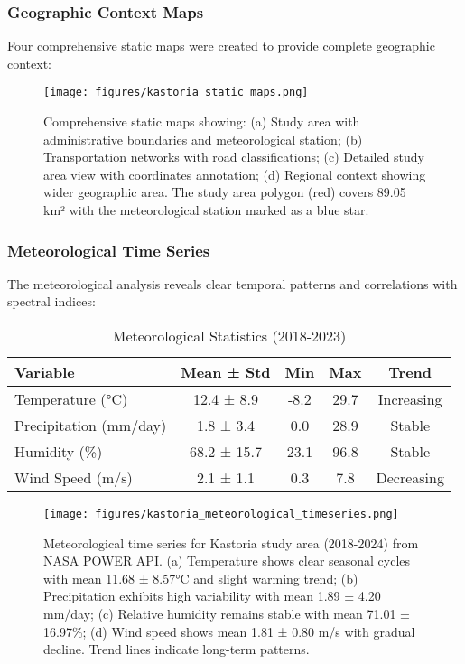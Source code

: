 \documentclass[a4paper,12pt]{article}
\begin{document}
\subsubsection{Geographic Context Maps}

Four comprehensive static maps were created to provide complete geographic
context:

\begin{figure}[H]
    \centering
    \texttt{[image: figures/kastoria\_static\_maps.png]}
    \caption{Comprehensive static maps showing: (a) Study area with administrative boundaries and meteorological station; (b) Transportation networks with road classifications; (c) Detailed study area view with coordinates annotation; (d) Regional context showing wider geographic area. The study area polygon (red) covers 89.05 km² with the meteorological station marked as a blue star.}
    \label{fig:static_maps}
\end{figure}

\subsubsection{Meteorological Time Series}

The meteorological analysis reveals clear temporal patterns and correlations
with spectral indices:

\begin{table}[H]
    \centering
    \caption{Meteorological Statistics (2018-2023)}
    \begin{tabular}{@{}lcccc@{}}
        \toprule
        Variable               & Mean ± Std  & Min  & Max  & Trend      \\
        \midrule
        Temperature (°C)       & 12.4 ± 8.9  & -8.2 & 29.7 & Increasing \\
        Precipitation (mm/day) & 1.8 ± 3.4   & 0.0  & 28.9 & Stable     \\
        Humidity (\%)          & 68.2 ± 15.7 & 23.1 & 96.8 & Stable     \\
        Wind Speed (m/s)       & 2.1 ± 1.1   & 0.3  & 7.8  & Decreasing \\
        \bottomrule
    \end{tabular}
\end{table}

\begin{figure}[H]
    \centering
    \texttt{[image: figures/kastoria\_meteorological\_timeseries.png]}
    \caption{Meteorological time series for Kastoria study area (2018-2024) from NASA POWER API. (a) Temperature shows clear seasonal cycles with mean 11.68 ± 8.57°C and slight warming trend; (b) Precipitation exhibits high variability with mean 1.89 ± 4.20 mm/day; (c) Relative humidity remains stable with mean 71.01 ± 16.97\%; (d) Wind speed shows mean 1.81 ± 0.80 m/s with gradual decline. Trend lines indicate long-term patterns.}
    \label{fig:met_timeseries}
\end{figure}
\end{document}
